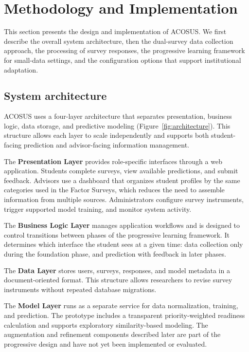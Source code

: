 \documentclass[letterpaper,11pt]{article}
\begin{document}
\section{Methodology and Implementation}\label{sec:methodology}

This section presents the design and implementation of ACOSUS. We first describe the overall system architecture, then the dual-survey data collection approach, the processing of survey responses, the progressive learning framework for small-data settings, and the configuration options that support institutional adaptation.

\subsection{System architecture}\label{subsec:sysarch}

ACOSUS uses a four-layer architecture that separates presentation, business logic, data storage, and predictive modeling (Figure~\ref{fig:architecture}). This structure allows each layer to scale independently and supports both student-facing prediction and advisor-facing information management.

The \textbf{Presentation Layer} provides role-specific interfaces through a web application. Students complete surveys, view available predictions, and submit feedback. Advisors use a dashboard that organizes student profiles by the same categories used in the Factor Surveys, which reduces the need to assemble information from multiple sources. Administrators configure survey instruments, trigger supported model training, and monitor system activity.

The \textbf{Business Logic Layer} manages application workflows and is designed to control transitions between phases of the progressive learning framework. It determines which interface the student sees at a given time: data collection only during the foundation phase, and prediction with feedback in later phases.

The \textbf{Data Layer} stores users, surveys, responses, and model metadata in a document-oriented format. This structure allows researchers to revise survey instruments without repeated database migrations.

The \textbf{Model Layer} runs as a separate service for data normalization, training, and prediction. The prototype includes a transparent priority-weighted readiness calculation and supports exploratory similarity-based modeling. The augmentation and refinement components described later are part of the progressive design and have not yet been implemented or evaluated.
\end{document}
